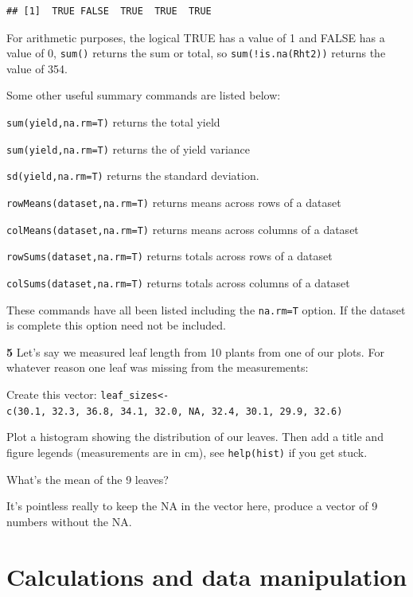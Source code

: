 \documentclass[
]{book}
\makeatletter
\newenvironment{kframe}{%
\medskip{}
\setlength{\fboxsep}{.8em}
 \def\at@end@of@kframe{}%
 \ifinner\ifhmode%
  \def\at@end@of@kframe{\end{minipage}}%
  \begin{minipage}{\columnwidth}%
 \fi\fi%
 \def\FrameCommand##1{\hskip\@totalleftmargin \hskip-\fboxsep
 \colorbox{shadecolor}{##1}\hskip-\fboxsep
     \hskip-\linewidth \hskip-\@totalleftmargin \hskip\columnwidth}%
 \MakeFramed {\advance\hsize-\width
   \@totalleftmargin\z@ \linewidth\hsize
   \@setminipage}}%
 {\par\unskip\endMakeFramed%
 \at@end@of@kframe}
\newenvironment{rmdblock}[1]
  {
  \begin{itemize}
  \renewcommand{\labelitemi}{
    \raisebox{-.7\height}[0pt][0pt]{
      {\setkeys{Gin}{width=3em,keepaspectratio}\texttt{[image: images/\#1]}}
    }
  }
  \setlength{\fboxsep}{1em}
  \begin{kframe}
  \item
  }
  {
  \end{kframe}
  \end{itemize}
  }
\newenvironment{rmdquiz}
  {\begin{rmdblock}{quiz}}
  {\end{rmdblock}}
\makeatother
\begin{document}
\begin{verbatim}
## [1]  TRUE FALSE  TRUE  TRUE  TRUE
\end{verbatim}

For arithmetic purposes, the logical TRUE has a value of 1 and FALSE has a value of 0, \texttt{sum()} returns the sum or total, so \texttt{sum(!is.na(Rht2))} returns the value of 354.

Some other useful summary commands are listed below:

\texttt{sum(yield,na.rm=T)} returns the total yield

\texttt{sum(yield,na.rm=T)} returns the of yield variance

\texttt{sd(yield,na.rm=T)} returns the standard deviation.

\texttt{rowMeans(dataset,na.rm=T)} returns means across rows of a dataset

\texttt{colMeans(dataset,na.rm=T)} returns means across columns of a dataset

\texttt{rowSums(dataset,na.rm=T)} returns totals across rows of a dataset

\texttt{colSums(dataset,na.rm=T)} returns totals across columns of a dataset

These commands have all been listed including the \texttt{na.rm=T} option. If the dataset is complete this option need not be included.

\begin{rmdquiz}
\textbf{5} Let's say we measured leaf length from 10 plants from one of our plots. For whatever reason one leaf was missing from the measurements:

Create this vector: \texttt{leaf\_sizes\textless{}-c(30.1,\ 32.3,\ 36.8,\ 34.1,\ 32.0,\ NA,\ 32.4,\ 30.1,\ 29.9,\ 32.6)}

Plot a histogram showing the distribution of our leaves. Then add a title and figure legends (measurements are in cm), see \texttt{help(hist)} if you get stuck.

What's the mean of the 9 leaves?

It's pointless really to keep the NA in the vector here, produce a vector of 9 numbers without the NA.\\
\end{rmdquiz}

\hypertarget{calculations-and-data-manipulation}{%
\section{Calculations and data manipulation}\label{calculations-and-data-manipulation}}
\end{document}
